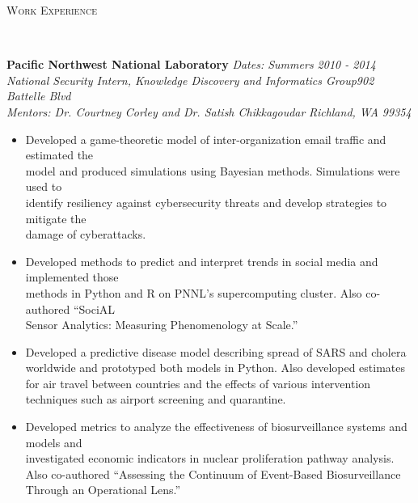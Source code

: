 \documentclass[11pt]{article}
\newenvironment{changemargin}[2]{%
  \begin{list}{}{%
    \setlength{\topsep}{0pt}%
    \setlength{\leftmargin}{#1}%
    \setlength{\rightmargin}{#2}%
    \setlength{\listparindent}{\parindent}%
    \setlength{\itemindent}{\parindent}%
    \setlength{\parsep}{\parskip}%
  }%
  \item[]}{\end{list}
}
\newcommand{\lineover}{
	\begin{changemargin}{-0.05in}{-0.05in}
		\vspace*{-8pt}
		\hrulefill \\
		\vspace*{-2pt}
	\end{changemargin}
}
\newcommand{\header}[1]{
	\begin{changemargin}{-0.5in}{-0.5in}
		\scshape{#1}\\
  	\lineover
	\end{changemargin}
}
\newenvironment{body} {
	\vspace*{-16pt}
	\begin{changemargin}{-0.25in}{-0.5in}
  }	
	{\end{changemargin}
}
\begin{document}
\header{Work Experience}

\begin{body}
	\vspace{14pt}

	\textbf{Pacific Northwest National Laboratory} \hfill \emph{Dates: Summers 2010 - 2014}\\ 
	\emph{National Security Intern, Knowledge Discovery and Informatics Group}\hfill \emph{902 Battelle Blvd}\\ \emph{Mentors: Dr. Courtney Corley and Dr. Satish Chikkagoudar} \hfill \emph{Richland, WA 99354}\\
	\vspace*{-4pt}
	\begin{itemize} \itemsep -0pt  %
\item Developed a game-theoretic model of inter-organization email traffic and estimated the\\ model and produced simulations using Bayesian methods. Simulations were used to\\ identify resiliency against cybersecurity threats and develop strategies to mitigate the\\ damage of cyberattacks.
\item Developed methods to predict and interpret trends in social media and implemented those\\ methods in Python and R on PNNL's supercomputing cluster. Also co-authored ``SociAL\\ Sensor Analytics: Measuring Phenomenology at Scale.''
\item Developed a predictive disease model describing spread of SARS and cholera worldwide and prototyped both models in Python. Also developed estimates for air travel between countries and the effects of various intervention techniques such as airport screening and quarantine.
\item Developed metrics to analyze the effectiveness of biosurveillance systems and models and\\ investigated economic indicators in nuclear proliferation pathway analysis. Also co-authored ``Assessing the Continuum of Event-Based Biosurveillance Through an Operational Lens.''
	\end{itemize}
	

\end{body}
\end{document}
